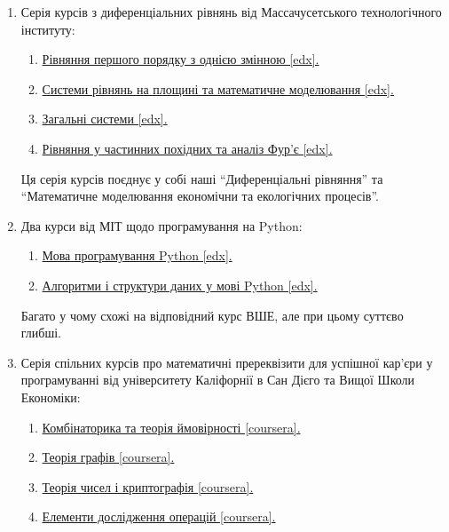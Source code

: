 \documentclass[14pt, a4paper]{extarticle}  %
\begin{document}
\begin{enumerate}
    \item Серія курсів з диференціальних рівнянь від Массачусетського технологічного інституту:
    \begin{enumerate}
    	\item \href{https://www.edx.org/course/introduction-differential-equations-mitx-18-031x}{Рівняння першого порядку з однією змінною [edx].}
    	\item \href{https://www.edx.org/course/differential-equations-2x2-systems-mitx-18-032x}{Системи рівнянь на площині та математичне моделювання [edx].}
    	\item \href{https://www.edx.org/course/differential-equations-linear-algebra-and-nxn-systems-of-differential-equations}{Загальні системи [edx].}
    	\item \href{https://www.edx.org/course/differential-equations-fourier-series-and-partial-differential-equations}{Рівняння у частинних похідних та аналіз Фур'є [edx].}
    \end{enumerate}
    Ця серія курсів поєднує у собі наші ``Диференціальні рівняння'' та ``Математичне моделювання економічни та екологічних процесів''.

    \item Два курси від МІТ щодо програмування на Python:
    \begin{enumerate}
    	\item \href{https://www.edx.org/course/introduction-to-computer-science-and-programming-using-python-0}{Мова програмування Python [edx].}
    	\item \href{https://www.edx.org/course/introduction-computational-thinking-data-mitx-6-00-2x-7}{Алгоритми і структури даних у мові Python [edx].}
    \end{enumerate}
    Багато у чому схожі на відповідний курс ВШЕ, але при цьому суттєво глибші.

    \item Серія спільних курсів про математичні пререквізити для успішної кар'єри у програмуванні від університету Каліфорнії в Сан Дієго та Вищої Школи Економіки:
    \begin{enumerate}
    	\item \href{https://www.coursera.org/learn/combinatorics}{ Комбінаторика та теорія ймовірності [coursera].}
    	\item \href{https://www.coursera.org/learn/graphs}{Теорія графів [coursera].}
    	\item \href{https://www.coursera.org/learn/number-theory-cryptography}{Теорія чисел і криптографія [coursera].}
    	\item \href{https://www.coursera.org/learn/delivery-problem}{Елементи дослідження операцій [coursera].}
    \end{enumerate}
\end{enumerate}
\end{document}
